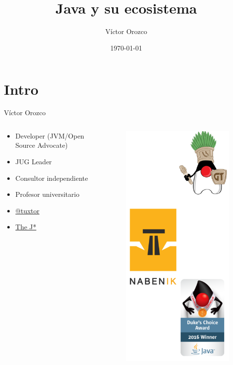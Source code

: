 \documentclass{beamer}
\title{Java y su ecosistema}
\author{Víctor Orozco}
\institute{GuateJUG}
\date{\today}
\begin{document}
\frame{\titlepage}

\section{Intro}

\begin{frame}{Víctor Orozco}
    \begin{columns}[T] %
        \begin{column}[T]{5cm} %
            \begin{itemize}
                \item Developer (JVM/Open Source Advocate)
                \item JUG Leader
                \item Consultor independiente
                \item Profesor universitario
                \item \href{https://twitter.com/tuxtor}{@tuxtor}
                \item \href{http://vorozco.com}{The J*} 
            \end{itemize}
        \end{column}
        \begin{column}[T]{5cm} %
            \begin{figure}
                \centering
                \includegraphics[width=0.6\linewidth]{Images/logos}
            \end{figure}
            

\end{column}
\end{columns}
\end{frame}
\end{document}
